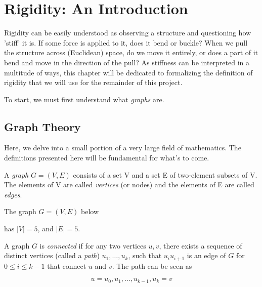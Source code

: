 \chapter{Rigidity: An Introduction} %

\begin{flushleft}
Rigidity can be easily understood as observing a structure and questioning how 'stiff' it is. If some force is applied to it, does it bend or buckle? When we pull the structure across (Euclidean) space, do we move it entirely, or does a part of it bend and move in the direction of the pull? As stiffness can be interpreted in a multitude of ways, this chapter will be dedicated to formalizing the definition of rigidity that we will use for the remainder of this project. 
\end{flushleft}

\begin{flushleft}
To start, we must first understand what \textit{graphs} are.
\end{flushleft}

\section{Graph Theory}

\begin{flushleft}
Here, we delve into a small portion of a very large field of mathematics. The definitions presented here will be fundamental for what's to come.
\end{flushleft}

\begin{definition}
    A \textit{graph} $G = (V,E)$ consists of a set V and a set E of two-element subsets of V. The elements of V are called \textit{vertices} (or nodes) and the elements of E are called \textit{edges}.
\end{definition}

\begin{example}
The graph $G = (V,E)$ below
\label{eg: cycle}
\begin{figure}[ht]
    \centering
    
    \label{simple graph}
\end{figure}
\noindent
has $|V| = 5$, and $|E| = 5$.
\end{example}

\begin{definition}
A graph $G$ is \textit{connected} if for any two vertices $u,v$, there exists a sequence of distinct vertices (called a \textit{path}) $u_1, \hdots, u_k$, such that $u_iu_{i+1}$ is an edge of $G$ for $0 \leq i \leq k-1$ that connect $u$ and $v$. The path can be seen as 

\[
u = u_0, u_1, \hdots, u_{k-1}, u_k = v
\]
\end{definition}

